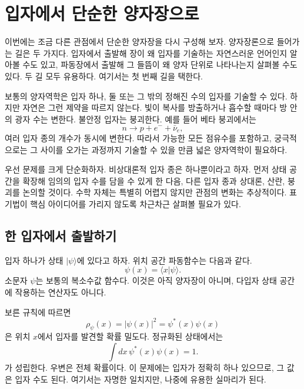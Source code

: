 \chapter{입자에서 단순한 양자장으로}

이번에는 조금 다른 관점에서 단순한 양자장을 다시 구성해 보자. 양자장론으로 들어가는 길은 두 가지다. 입자에서 출발해 장이 왜 입자를 기술하는 자연스러운 언어인지 알아볼 수도 있고, 파동장에서 출발해 그 들뜸이 왜 양자 단위로 나타나는지 살펴볼 수도 있다. 두 길 모두 유용하다. 여기서는 첫 번째 길을 택한다.

보통의 양자역학은 입자 하나, 둘 또는 그 밖의 정해진 수의 입자를 기술할 수 있다. 하지만 자연은 그런 제약을 따르지 않는다. 빛이 복사를 방출하거나 흡수할 때마다 방 안의 광자 수는 변한다. 불안정 입자는 붕괴한다. 예를 들어 베타 붕괴에서는
\begin{equation}
n\longrightarrow p+e^-+\bar{\nu}_e,
\end{equation}
여러 입자 종의 개수가 동시에 변한다. 따라서 가능한 모든 점유수를 포함하고, 궁극적으로는 그 사이를 오가는 과정까지 기술할 수 있을 만큼 넓은 양자역학이 필요하다.

우선 문제를 크게 단순화하자. 비상대론적 입자 종은 하나뿐이라고 하자. 먼저 상태 공간을 확장해 임의의 입자 수를 담을 수 있게 한 다음, 다른 입자 종과 상대론, 산란, 붕괴를 논의할 것이다. 수학 자체는 특별히 어렵지 않지만 관점의 변화는 추상적이다. 표기법이 핵심 아이디어를 가리지 않도록 차근차근 살펴볼 필요가 있다.

\section{한 입자에서 출발하기}

입자 하나가 상태 \(|\psi\rangle\)에 있다고 하자. 위치 공간 파동함수는 다음과 같다.
\begin{equation}
\psi(x)=\langle x|\psi\rangle.
\label{eq:l07-wavefunction}
\end{equation}
소문자 \(\psi\)는 보통의 복소수값 함수다. 이것은 아직 양자장이 아니며, 다입자 상태 공간에 작용하는 연산자도 아니다.

보른 규칙에 따르면
\begin{equation}
\rho_\psi(x)=|\psi(x)|^2=\psi^*(x)\psi(x)
\label{eq:l07-born-density}
\end{equation}
은 위치 \(x\)에서 입자를 발견할 확률 밀도다. 정규화된 상태에서는
\begin{equation}
\int dx\,\psi^*(x)\psi(x)=1.
\label{eq:l07-one-particle-normalization}
\end{equation}
가 성립한다. 우변은 전체 확률이다. 이 문제에는 입자가 정확히 하나 있으므로, 그 값은 입자 수도 된다. 여기서는 자명한 일치지만, 나중에 유용한 실마리가 된다.

